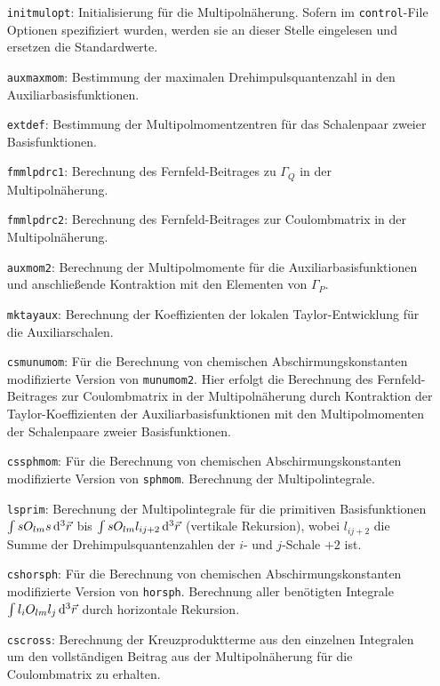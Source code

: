 	\begin{itemize}[leftmargin=70pt]
	\item[\texttt{initmulopt}:] Initialisierung für die Multipolnäherung. Sofern im \texttt{control}-File Optionen spezifiziert wurden, werden sie an dieser Stelle eingelesen und ersetzen die Standardwerte.
	\item[\texttt{auxmaxmom}:] Bestimmung der maximalen Drehimpulsquantenzahl in den Auxiliarbasisfunktionen.
	\item[\texttt{extdef}:] Bestimmung der Multipolmomentzentren für das Schalenpaar zweier Basisfunktionen.
	\item[\texttt{fmmlpdrc1}:] Berechnung des Fernfeld-Beitrages zu $\Gamma_Q$ in der Multipolnäherung.
	\item[\texttt{fmmlpdrc2}:] Berechnung des Fernfeld-Beitrages zur Coulombmatrix in der Multipolnäherung.
	\item[\texttt{auxmom2}:] Berechnung der Multipolmomente für die Auxiliarbasisfunktionen und anschließende Kontraktion mit den Elementen von $\Gamma_P$.
	\item[\texttt{mktayaux}:] Berechnung der Koeffizienten der lokalen Taylor-Entwicklung für die Auxiliarschalen.
	\item[\texttt{csmunumom}:] Für die Berechnung von chemischen Abschirmungskonstanten modifizierte Version von \texttt{munumom2}. Hier erfolgt die Berechnung des Fernfeld-Beitrages zur Coulombmatrix in der Multipolnäherung durch Kontraktion der Taylor-Koeffizienten der Auxiliarbasisfunktionen mit den Multipolmomenten der Schalenpaare zweier Basisfunktionen.
	\item[\texttt{cssphmom}:] Für die Berechnung von chemischen Abschirmungskonstanten modifizierte Version von \texttt{sphmom}. Berechnung der Multipolintegrale.
	\item[\texttt{lsprim}:] Berechnung der Multipolintegrale für die primitiven Basisfunktionen $\int s O_{lm} s\mathop{}\!\mathrm{d^3}\vec{r}$ bis $\int s O_{lm} l_{ij+2} \mathop{}\!\mathrm{d^3}\vec{r}$ (vertikale Rekursion), wobei $l_{ij+2}$ die Summe der Drehimpulsquantenzahlen der $i$- und $j$-Schale $+2$ ist.
	\item[\texttt{cshorsph}:] Für die Berechnung von chemischen Abschirmungskonstanten modifizierte Version von \texttt{horsph}. Berechnung aller benötigten Integrale  $\int l_i O_{lm} l_j\mathop{}\!\mathrm{d^3}\vec{r}$ durch horizontale Rekursion.
	\item[\texttt{cscross}:] Berechnung der Kreuzproduktterme aus den einzelnen Integralen um den vollständigen Beitrag aus der Multipolnäherung für die Coulombmatrix zu erhalten.
	\end{itemize}
	
